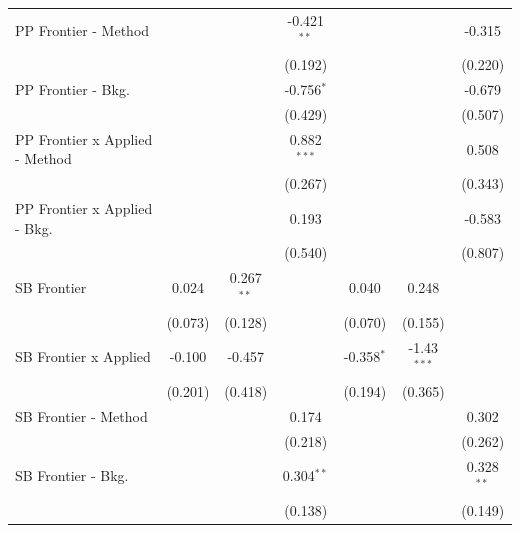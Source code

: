 \begin{tabular}{lcccccc}
   PP Frontier - Method           &              &              & -0.421$^{**}$ &              &               & -0.315\\   
                                  &              &              & (0.192)       &              &               & (0.220)\\   
   PP Frontier - Bkg.             &              &              & -0.756$^{*}$  &              &               & -0.679\\   
                                  &              &              & (0.429)       &              &               & (0.507)\\   
   PP Frontier x Applied - Method &              &              & 0.882$^{***}$ &              &               & 0.508\\   
                                  &              &              & (0.267)       &              &               & (0.343)\\   
   PP Frontier x Applied - Bkg.   &              &              & 0.193         &              &               & -0.583\\   
                                  &              &              & (0.540)       &              &               & (0.807)\\   
   SB Frontier                    & 0.024        & 0.267$^{**}$ &               & 0.040        & 0.248         &   \\   
                                  & (0.073)      & (0.128)      &               & (0.070)      & (0.155)       &   \\   
   SB Frontier x Applied          & -0.100       & -0.457       &               & -0.358$^{*}$ & -1.43$^{***}$ &   \\   
                                  & (0.201)      & (0.418)      &               & (0.194)      & (0.365)       &   \\   
   SB Frontier - Method           &              &              & 0.174         &              &               & 0.302\\   
                                  &              &              & (0.218)       &              &               & (0.262)\\   
   SB Frontier - Bkg.             &              &              & 0.304$^{**}$  &              &               & 0.328$^{**}$\\   
                                  &              &              & (0.138)       &              &               & (0.149)\\   

\end{tabular}
